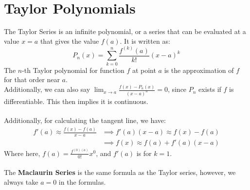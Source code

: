 \documentclass{article}
\begin{document}
\section{Taylor Polynomials}
The Taylor Series is an infinite polynomial, or a series that can be evaluated at a value $x = a$ that gives the value $f(a)$. It is written as:
$$P_n(x) = \sum_{k=0}^n \frac{f^{(k)}(a)}{k!}(x-a)^k$$
The $n$-th Taylor polynomial for function $f$ at point $a$ is the approximation of $f$ for that order near $a$.\\
Additionally, we can also say $\lim_{x\to a} \frac{f(x)  - P_n(x)}{(x-a)^n} = 0$, since $P_n$ exists if $f$ is differentiable. This then implies it is continuous.\\
\\
Additionally, for calculating the tangent line, we have:
\begin{align*}
    f'(a) \approx \frac{f(x) - f(a)}{x - a} & \implies f'(a)(x-a) \approx f(x) - f(a)\\
    & \implies f(x) \approx f(a) + f'(a)(x-a)
\end{align*}
Where here, $f(a) = \frac{f^{(0)(a)}}{0!}x^0$, and $f'(a)$ is for $k =1$.\\
\\
The \textbf{Maclaurin Series} is the same formula as the Taylor series, however, we always take $a = 0$ in the formulas.
\end{document}
